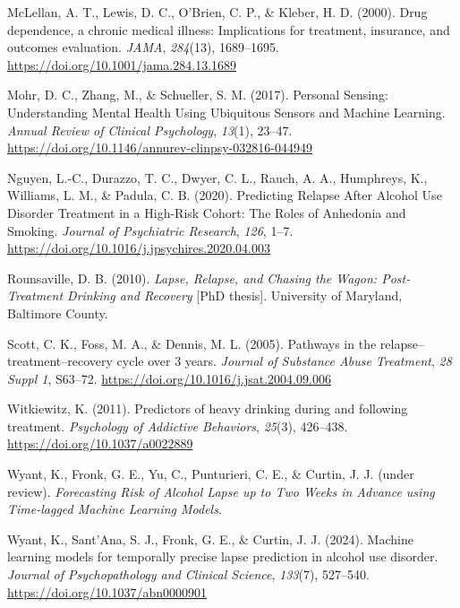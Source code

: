 \documentclass[
  letterpaper,
  DIV=11,
  numbers=noendperiod]{scrartcl}
\newlength{\cslhangindent}
\newenvironment{CSLReferences}[2] %
 {\begin{list}{}{%
  \setlength{\itemindent}{0pt}
  \setlength{\leftmargin}{0pt}
  \setlength{\parsep}{0pt}
  \ifodd #1
   \setlength{\leftmargin}{\cslhangindent}
   \setlength{\itemindent}{-1\cslhangindent}
  \fi
  \setlength{\itemsep}{#2\baselineskip}}}
 {\end{list}}
\begin{document}
\begin{CSLReferences}{1}{0}
McLellan, A. T., Lewis, D. C., O'Brien, C. P., \& Kleber, H. D. (2000).
Drug dependence, a chronic medical illness: Implications for treatment,
insurance, and outcomes evaluation. \emph{JAMA}, \emph{284}(13),
1689--1695. \url{https://doi.org/10.1001/jama.284.13.1689}

Mohr, D. C., Zhang, M., \& Schueller, S. M. (2017). Personal {Sensing}:
{Understanding Mental Health Using Ubiquitous Sensors} and {Machine
Learning}. \emph{Annual Review of Clinical Psychology}, \emph{13}(1),
23--47. \url{https://doi.org/10.1146/annurev-clinpsy-032816-044949}

Nguyen, L.-C., Durazzo, T. C., Dwyer, C. L., Rauch, A. A., Humphreys,
K., Williams, L. M., \& Padula, C. B. (2020). Predicting {Relapse After
Alcohol Use Disorder Treatment} in a {High-Risk Cohort}: {The Roles} of
{Anhedonia} and {Smoking}. \emph{Journal of Psychiatric Research},
\emph{126}, 1--7. \url{https://doi.org/10.1016/j.jpsychires.2020.04.003}

Rounsaville, D. B. (2010). \emph{Lapse, {Relapse}, and {Chasing} the
{Wagon}: {Post-Treatment Drinking} and {Recovery}} {[}PhD thesis{]}.
University of Maryland, Baltimore County.

Scott, C. K., Foss, M. A., \& Dennis, M. L. (2005). Pathways in the
relapse--treatment--recovery cycle over 3 years. \emph{Journal of
Substance Abuse Treatment}, \emph{28 Suppl 1}, S63--72.
\url{https://doi.org/10.1016/j.jsat.2004.09.006}

Witkiewitz, K. (2011). Predictors of heavy drinking during and following
treatment. \emph{Psychology of Addictive Behaviors}, \emph{25}(3),
426--438. \url{https://doi.org/10.1037/a0022889}

Wyant, K., Fronk, G. E., Yu, C., Punturieri, C. E., \& Curtin, J. J.
(under review). \emph{Forecasting {Risk} of {Alcohol Lapse} up to {Two
Weeks} in {Advance} using {Time-lagged Machine Learning Models}}.

Wyant, K., Sant'Ana, S. J., Fronk, G. E., \& Curtin, J. J. (2024).
Machine learning models for temporally precise lapse prediction in
alcohol use disorder. \emph{Journal of Psychopathology and Clinical
Science}, \emph{133}(7), 527--540.
\url{https://doi.org/10.1037/abn0000901}

\end{CSLReferences}
\end{document}
